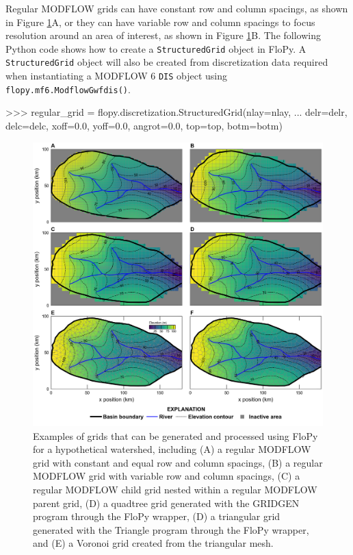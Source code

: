 \documentclass[11pt, oneside]{article}  	%
\begin{document}
Regular MODFLOW grids can have constant row and column spacings, as shown in Figure \ref{fig:grids}A, or they can have variable row and column spacings to focus resolution around an area of interest, as shown in Figure \ref{fig:grids}B. The following Python code shows how to create a \texttt{StructuredGrid} object in FloPy. A \texttt{StructuredGrid} object will also be created from discretization data required when instantiating a MODFLOW 6 \texttt{DIS} object using \texttt{flopy.mf6.ModflowGwfdis()}. 

\begin{python}
>>> regular_grid = flopy.discretization.StructuredGrid(nlay=nlay, 
... delr=delr, delc=delc, xoff=0.0, yoff=0.0, angrot=0.0, top=top, botm=botm)
\end{python}


\begin{figure}[ht!]
	\begin{center}
		\includegraphics{figures/grids_geoprocessing.png}
	\end{center}
	\caption{Examples of grids that can be generated and processed using FloPy for a hypothetical watershed, including (A) a regular MODFLOW grid with constant and equal row and column spacings, (B) a regular MODFLOW grid with variable row and column spacings, (C) a regular MODFLOW child grid nested within a regular MODFLOW parent grid, (D) a quadtree grid generated with the GRIDGEN program \citep{gridgen} through the FloPy wrapper, (D) a triangular grid generated with the Triangle program \citep{trianglemesh} through the FloPy wrapper, and (E) a Voronoi grid created from the triangular mesh.}\label{fig:grids}
\end{figure}
\end{document}
